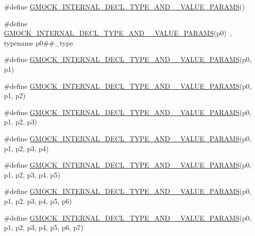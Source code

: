 \begin{DoxyCompactItemize}
\item 
\#define \mbox{\hyperlink{gmock-generated-actions_8h_a9eda3221eac423c7026d63fc486d1296}{G\+M\+O\+C\+K\+\_\+\+I\+N\+T\+E\+R\+N\+A\+L\+\_\+\+D\+E\+C\+L\+\_\+\+T\+Y\+P\+E\+\_\+\+A\+N\+D\+\_\+\_\+\+V\+A\+L\+U\+E\+\_\+\+P\+A\+R\+A\+MS}}()
\item 
\#define \mbox{\hyperlink{gmock-generated-actions_8h_a462396713d8024e37a66fb12abd87a00}{G\+M\+O\+C\+K\+\_\+\+I\+N\+T\+E\+R\+N\+A\+L\+\_\+\+D\+E\+C\+L\+\_\+\+T\+Y\+P\+E\+\_\+\+A\+N\+D\+\_\+\_\+\+V\+A\+L\+U\+E\+\_\+\+P\+A\+R\+A\+MS}}(p0)~, typename p0\#\#\+\_\+type
\item 
\#define \mbox{\hyperlink{gmock-generated-actions_8h_a8de8a9ba55313f4f4ba936c28ffe0d93}{G\+M\+O\+C\+K\+\_\+\+I\+N\+T\+E\+R\+N\+A\+L\+\_\+\+D\+E\+C\+L\+\_\+\+T\+Y\+P\+E\+\_\+\+A\+N\+D\+\_\+\_\+\+V\+A\+L\+U\+E\+\_\+\+P\+A\+R\+A\+MS}}(p0,  p1)
\item 
\#define \mbox{\hyperlink{gmock-generated-actions_8h_a2def1ab63696280e9b8c20ed176d0c92}{G\+M\+O\+C\+K\+\_\+\+I\+N\+T\+E\+R\+N\+A\+L\+\_\+\+D\+E\+C\+L\+\_\+\+T\+Y\+P\+E\+\_\+\+A\+N\+D\+\_\+\_\+\+V\+A\+L\+U\+E\+\_\+\+P\+A\+R\+A\+MS}}(p0,  p1,  p2)
\item 
\#define \mbox{\hyperlink{gmock-generated-actions_8h_aff64ba07ea8171eb7bacb655127120f7}{G\+M\+O\+C\+K\+\_\+\+I\+N\+T\+E\+R\+N\+A\+L\+\_\+\+D\+E\+C\+L\+\_\+\+T\+Y\+P\+E\+\_\+\+A\+N\+D\+\_\+\_\+\+V\+A\+L\+U\+E\+\_\+\+P\+A\+R\+A\+MS}}(p0,  p1,  p2,  p3)
\item 
\#define \mbox{\hyperlink{gmock-generated-actions_8h_a1f0b43fe98dabf52fa9dbffa0966d7f3}{G\+M\+O\+C\+K\+\_\+\+I\+N\+T\+E\+R\+N\+A\+L\+\_\+\+D\+E\+C\+L\+\_\+\+T\+Y\+P\+E\+\_\+\+A\+N\+D\+\_\+\_\+\+V\+A\+L\+U\+E\+\_\+\+P\+A\+R\+A\+MS}}(p0,  p1,  p2,  p3,  p4)
\item 
\#define \mbox{\hyperlink{gmock-generated-actions_8h_abffe20cc195c1f2a1682878bb7f7a35d}{G\+M\+O\+C\+K\+\_\+\+I\+N\+T\+E\+R\+N\+A\+L\+\_\+\+D\+E\+C\+L\+\_\+\+T\+Y\+P\+E\+\_\+\+A\+N\+D\+\_\+\_\+\+V\+A\+L\+U\+E\+\_\+\+P\+A\+R\+A\+MS}}(p0,  p1,  p2,  p3,  p4,  p5)
\item 
\#define \mbox{\hyperlink{gmock-generated-actions_8h_acb3b2a137310a0ac944d3695a0911a64}{G\+M\+O\+C\+K\+\_\+\+I\+N\+T\+E\+R\+N\+A\+L\+\_\+\+D\+E\+C\+L\+\_\+\+T\+Y\+P\+E\+\_\+\+A\+N\+D\+\_\+\_\+\+V\+A\+L\+U\+E\+\_\+\+P\+A\+R\+A\+MS}}(p0,  p1,  p2,  p3,  p4,  p5,  p6)
\item 
\#define \mbox{\hyperlink{gmock-generated-actions_8h_af6338728a5c12281280830ec7c5f685a}{G\+M\+O\+C\+K\+\_\+\+I\+N\+T\+E\+R\+N\+A\+L\+\_\+\+D\+E\+C\+L\+\_\+\+T\+Y\+P\+E\+\_\+\+A\+N\+D\+\_\+\_\+\+V\+A\+L\+U\+E\+\_\+\+P\+A\+R\+A\+MS}}(p0,  p1,  p2,  p3,  p4,  p5,  p6,  p7)

\end{DoxyCompactItemize}
